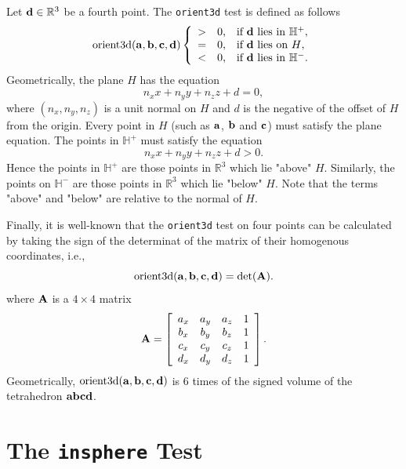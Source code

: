 Let ${\bf d} \in \mathbb{R}^3$ be a fourth point. The {\tt orient3d} test is defined as follows
\begin{equation}
  \textrm{orient3d}({\bf a}, {\bf b}, {\bf c}, {\bf d})
  \left\{
  \begin{array}{ccl}
  > & 0, & \textrm{if ${\bf d}$ lies in $\mathbb{H}^+$},\\
  = & 0, & \textrm{if ${\bf d}$ lies on $H$},\\
  < & 0, & \textrm{if ${\bf d}$ lies in $\mathbb{H}^-$}.  
  \end{array}
  \right.
\end{equation}
Geometrically, the plane $H$ has the equation
\[
 n_x x + n_y y + n_z z + d = 0,
\]
where $(n_x, n_y, n_z)$ is a unit normal on $H$ and $d$ is the negative of the offset of $H$ from the origin. Every point in $H$ (such as ${\bf a}$, ${\bf b}$ and ${\bf c}$) must satisfy the plane equation. The points in $\mathbb{H}^+$ must satisfy the equation
\[
 n_x x + n_y y + n_z z + d > 0.
\]
Hence the points in $\mathbb{H}^+$ are those points in $\mathbb{R}^3$ which lie "above" $H$. Similarly, the points on $\mathbb{H}^-$ are those points  in $\mathbb{R}^3$ which lie "below" $H$. Note that the terms "above" and "below" are relative to the normal of $H$.

Finally, it is well-known that the {\tt orient3d} test on four points can be calculated by taking the sign of the determinat of the matrix of their homogenous coordinates, i.e.,
\begin{equation}
  \textrm{orient3d}({\bf a}, {\bf b}, {\bf c}, {\bf d}) = \textrm{det}({\bf A}).
\end{equation}
where ${\bf A}$ is a $4 \times 4$ matrix
\[
  {\bf A} = \left[\begin{array}{cccc}
      a_x & a_y & a_z & 1\\
      b_x & b_y & b_z  & 1\\
      c_x & c_y & c_z  & 1\\
      d_x & d_y & d_z  & 1
      \end{array}\right].
\]
Geometrically, $\textrm{orient3d}({\bf a}, {\bf b}, {\bf c}, {\bf d})$ is $6$ times of the signed volume of the tetrahedron ${\bf abcd}$.

\section{The {\tt insphere} Test}

